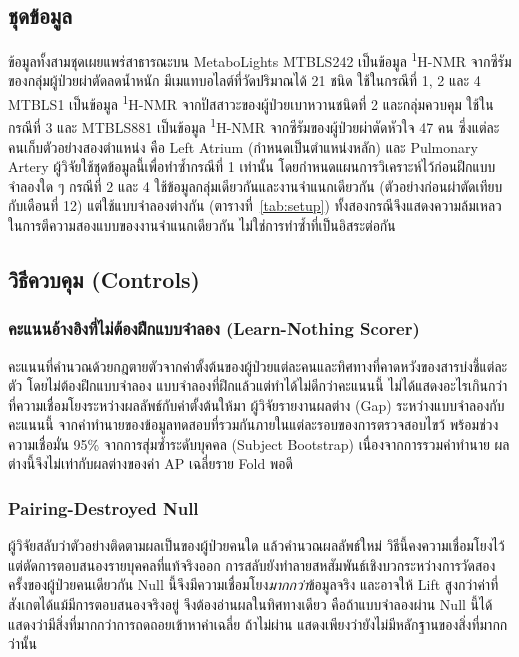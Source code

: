 \documentclass[11pt,a4paper]{article}
\begin{document}
\subsection{ชุดข้อมูล}
ข้อมูลทั้งสามชุดเผยแพร่สาธารณะบน MetaboLights \cite{haug2020}
MTBLS242 เป็นข้อมูล \textsuperscript{1}H-NMR จากซีรัมของกลุ่มผู้ป่วยผ่าตัดลดน้ำหนัก
มีเมแทบอไลต์ที่วัดปริมาณได้ 21 ชนิด \cite{mtbls242, gralka2015} ใช้ในกรณีที่ 1, 2 และ 4
MTBLS1 เป็นข้อมูล \textsuperscript{1}H-NMR จากปัสสาวะของผู้ป่วยเบาหวานชนิดที่ 2
และกลุ่มควบคุม \cite{salek2007} ใช้ในกรณีที่ 3
และ MTBLS881 เป็นข้อมูล \textsuperscript{1}H-NMR จากซีรัมของผู้ป่วยผ่าตัดหัวใจ 47 คน
ซึ่งแต่ละคนเก็บตัวอย่างสองตำแหน่ง คือ Left Atrium (กำหนดเป็นตำแหน่งหลัก)
และ Pulmonary Artery \cite{maltesen2020} ผู้วิจัยใช้ชุดข้อมูลนี้เพื่อทำซ้ำกรณีที่ 1 เท่านั้น
โดยกำหนดแผนการวิเคราะห์ไว้ก่อนฝึกแบบจำลองใด ๆ
กรณีที่ 2 และ 4 ใช้ข้อมูลกลุ่มเดียวกันและงานจำแนกเดียวกัน
(ตัวอย่างก่อนผ่าตัดเทียบกับเดือนที่ 12) แต่ใช้แบบจำลองต่างกัน (ตารางที่~\ref{tab:setup})
ทั้งสองกรณีจึงแสดงความล้มเหลวในการตีความสองแบบของงานจำแนกเดียวกัน
ไม่ใช่การทำซ้ำที่เป็นอิสระต่อกัน

\subsection{วิธีควบคุม (Controls)}

\subsubsection{คะแนนอ้างอิงที่ไม่ต้องฝึกแบบจำลอง (Learn-Nothing Scorer)}
คะแนนที่คำนวณด้วยกฎตายตัวจากค่าตั้งต้นของผู้ป่วยแต่ละคนและทิศทางที่คาดหวังของสารบ่งชี้แต่ละตัว
โดยไม่ต้องฝึกแบบจำลอง แบบจำลองที่ฝึกแล้วแต่ทำได้ไม่ดีกว่าคะแนนนี้
ไม่ได้แสดงอะไรเกินกว่าที่ความเชื่อมโยงระหว่างผลลัพธ์กับค่าตั้งต้นให้มา
ผู้วิจัยรายงานผลต่าง (Gap) ระหว่างแบบจำลองกับคะแนนนี้
จากค่าทำนายของข้อมูลทดสอบที่รวมกันภายในแต่ละรอบของการตรวจสอบไขว้
พร้อมช่วงความเชื่อมั่น 95\% จากการสุ่มซ้ำระดับบุคคล (Subject Bootstrap)
เนื่องจากการรวมค่าทำนาย ผลต่างนี้จึงไม่เท่ากับผลต่างของค่า AP เฉลี่ยราย Fold พอดี

\subsubsection{Pairing-Destroyed Null}
ผู้วิจัยสลับว่าตัวอย่างติดตามผลเป็นของผู้ป่วยคนใด แล้วคำนวณผลลัพธ์ใหม่
วิธีนี้คงความเชื่อมโยงไว้แต่ตัดการตอบสนองรายบุคคลที่แท้จริงออก
การสลับยังทำลายสหสัมพันธ์เชิงบวกระหว่างการวัดสองครั้งของผู้ป่วยคนเดียวกัน
Null นี้จึงมีความเชื่อมโยง\textit{มากกว่า}ข้อมูลจริง
และอาจให้ Lift สูงกว่าค่าที่สังเกตได้แม้มีการตอบสนองจริงอยู่
จึงต้องอ่านผลในทิศทางเดียว คือถ้าแบบจำลองผ่าน Null นี้ได้
แสดงว่ามีสิ่งที่มากกว่าการถดถอยเข้าหาค่าเฉลี่ย
ถ้าไม่ผ่าน แสดงเพียงว่ายังไม่มีหลักฐานของสิ่งที่มากกว่านั้น
\end{document}
